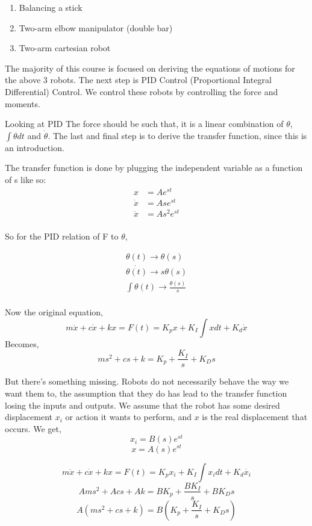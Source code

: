 \documentclass{report}
\begin{document}
\begin{enumerate}
	\item Balancing a stick
	\item Two-arm elbow manipulator (double bar)
	\item Two-arm cartesian robot
\end{enumerate}
The majority of this course is focused on deriving the equations of motions for the above 3 robots. The next step is PID Control (Proportional Integral Differential) Control. We control these robots by controlling the force and moments.

Looking at PID
The force should be such that, it is a linear combination of $\theta$, $\int \theta dt$ and $\dot{\theta}$. The last and final step is to derive the transfer function, since this is an introduction.

The transfer function is done by plugging the independent variable as a function of s like so:
\begin{align*}
	x &= Ae^{st} \\
	\dot{x} &= Ase^{st} \\
	\ddot{x} &= As^2e^{st} \\
\end{align*}

So for the PID relation of F to $\theta$,

\begin{align*}
	\theta(t) \rightarrow \theta(s) \\
	\dot{\theta(t)} \rightarrow s\theta(s) \\
	\int \theta (t) \rightarrow \frac{\theta(s)}{s} \\
\end{align*}

Now the original equation, 
\[m \ddot{x} + c\dot{x} + k x = F(t) = K_p x + K_I \int x dt + K_d \dot{x} \]
Becomes,
\[ms^2  + cs + k = K_p + \frac{K_I}{s} + K_Ds\]

But there's something missing. Robots do not necessarily behave the way we want them to, the assumption that they do has lead to the transfer function losing the inputs and outputs. We assume that the robot has some desired displacement $x_i$ or action it wants to perform, and $x$ is the real displacement that occurs.
We get,
\[ x_i = B(s)e^{st}\]
\[ x = A(s)e^{st}\]

\[m \ddot{x} + c\dot{x} + k x = F(t) = K_p x_i + K_I \int x_i dt + K_d \dot{x_i} \]
\[Ams^2  + Acs + Ak = B K_p + \frac{BK_I}{s} + BK_Ds\]
\[A(ms^2  + cs + k) = B(K_p + \frac{K_I}{s} + K_Ds)\]
\end{document}
